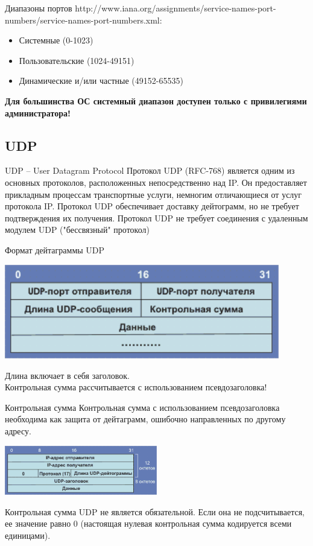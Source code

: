 \begin{frame}{Диапазоны портов}
	http://www.iana.org/assignments/service-names-port-numbers/service-names-port-numbers.xml:\\
	\begin{itemize}
		\item Системные (0-1023)
		\item Пользовательские (1024-49151)
		\item Динамические и/или частные (49152-65535)
	\end{itemize}
	\bigskip
	{\bfseries Для большинства ОС системный диапазон доступен только с привилегиями администратора!}
\end{frame}

\subsection{UDP}
\begin{frame}{UDP -- User Datagram Protocol}
Протокол UDP (RFC-768) является одним из основных протоколов,  расположенных непосредственно над IP. Он предоставляет прикладным процессам транспортные услуги,  немногим отличающиеся от услуг протокола IP.
\bigskip
Протокол UDP обеспечивает доставку дейтограмм,  но не требует подтверждения их получения. Протокол UDP не требует соединения с удаленным модулем UDP ("бессвязный" протокол)
\end{frame}

\begin{frame}{Формат дейтаграммы UDP}
	\begin{center}
		\includegraphics[width=0.9\textwidth]{04-udp_header.png}
	\end{center}
	Длина включает в себя заголовок.\\
	Контрольная сумма рассчитывается с использованием псевдозаголовка!
\end{frame}

\begin{frame}{Контрольная сумма}
Контрольная сумма с использованием псевдозаголовка необходима как защита от дейтаграмм, ошибочно направленных по другому адресу.
	\begin{center}
		\includegraphics[width=0.5\textwidth]{04-udp_pseudoheader.png}
	\end{center}
Контрольная сумма UDP не является обязательной. Если она не подсчитывается,  ее значение равно 0 (настоящая нулевая контрольная сумма кодируется всеми единицами).
\end{frame}

